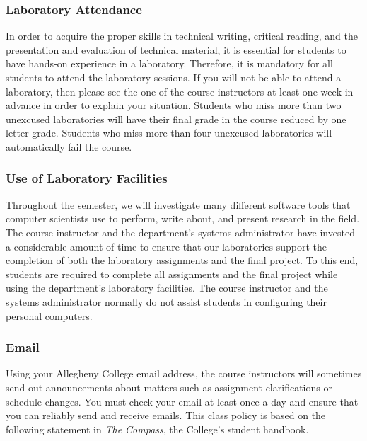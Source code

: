 \vspace{-.20in}
\subsubsection*{Laboratory Attendance}

In order to acquire the proper skills in technical writing, critical reading, and the presentation and evaluation of
technical material, it is essential for students to have hands-on experience in a laboratory. Therefore, it is mandatory
for all students to attend the laboratory sessions. If you will not be able to attend a laboratory, then please see the
one of the course instructors at least one week in advance in order to explain your situation. Students who miss more
than two unexcused laboratories will have their final grade in the course reduced by one letter grade.  Students who
miss more than four unexcused laboratories will automatically fail the course.

\vspace{-.1in}
\subsubsection*{Use of Laboratory Facilities}

Throughout the semester, we will investigate many different software tools that computer scientists use to perform,
write about, and present research in the field.  The course instructor and the department's systems administrator have
invested a considerable amount of time to ensure that our laboratories support the completion of both the laboratory
assignments and the final project.  To this end, students are required to complete all assignments and the final project
while using the department's laboratory facilities. The course instructor and the systems administrator normally do not
assist students in configuring their personal computers.

\vspace{-.10in}
\subsubsection*{Email}

Using your Allegheny College email address, the course instructors will sometimes send out announcements about matters
such as assignment clarifications or schedule changes. You must check your email at least once a day and ensure that
you can reliably send and receive emails. This class policy is based on the following statement in {\em The Compass},
the College's student handbook.

